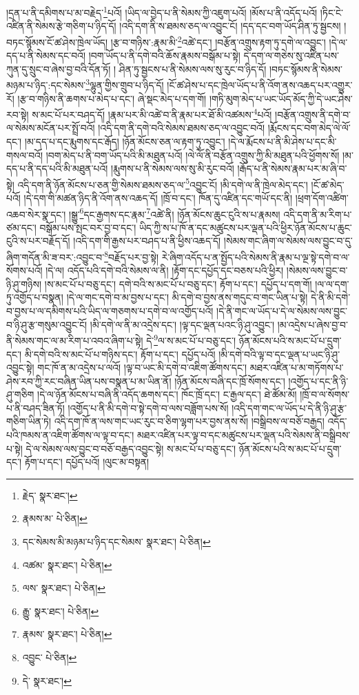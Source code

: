 །དྲན་པ་ནི་དམིགས་པ་མ་བརྗེད་\footnote{རྗེད་  སྣར་ཐང་། }པའོ། །ཡིད་ལ་བྱེད་པ་ནི་སེམས་ཀྱི་འཇུག་པའོ། །མོས་པ་ནི་འདོད་པའོ། །ཏིང་ངེ་འཛིན་ནི་སེམས་རྩེ་གཅིག་པ་ཉིད་དོ། །འདི་དག་ནི་ས་ཐམས་ཅད་ལ་འབྱུང་ངོ། །དད་དང་བག་ཡོད་ཤིན་ཏུ་སྦྱངས། །བཏང་སྙོམས་ངོ་ཚ་ཤེས་ཁྲེལ་ཡོད། །རྩ་བ་གཉིས་:རྣམ་མི་\footnote{རྣམས་མ་  པེ་ཅིན། }འཚེ་དང་། །བརྩོན་འགྲུས་རྟག་ཏུ་དགེ་ལ་འབྱུང་། །དེ་ལ་དད་པ་ནི་སེམས་དང་བའོ། །བག་ཡོད་པ་ནི་དགེ་བའི་ཆོས་རྣམས་བསྒོམ་པ་སྟེ། དེ་དག་ལ་གཅེས་སུ་འཛིན་པས་ཀུན་དུ་སྲུང་བ་ཞེས་བྱ་བའི་དོན་ཏོ། །
ཤིན་ཏུ་སྦྱངས་པ་ནི་སེམས་ལས་སུ་རུང་བ་ཉིད་དོ། །བཏང་སྙོམས་ནི་སེམས་མཉམ་པ་ཉིད་:དང་སེམས་\footnote{དང་སེམས་མི་མཉམ་པ་ཉིད་དང་སེམས་  སྣར་ཐང་།  པེ་ཅིན། }ལྷུན་གྱིས་གྲུབ་པ་ཉིད་དོ། །ངོ་ཚ་ཤེས་པ་དང་ཁྲེལ་ཡོད་པ་ནི་འོག་ནས་འཆད་པར་འགྱུར་རོ། །རྩ་བ་གཉིས་ནི་ཆགས་པ་མེད་པ་དང་། ཞེ་སྡང་མེད་པ་དག་གོ། །གཏི་མུག་མེད་པ་ཡང་ཡོད་མོད་ཀྱི་དེ་ཡང་ཤེས་རབ་སྟེ། ས་མང་པོ་པར་བཤད་དོ། །རྣམ་པར་མི་འཚེ་བ་ནི་རྣམ་པར་ཐོ་མི་འཚམས་\footnote{འཚམ་  སྣར་ཐང་།  པེ་ཅིན། }པའོ། །བརྩོན་འགྲུས་ནི་དགེ་བ་ལ་སེམས་མངོན་པར་སྤྲོ་བའོ། །འདི་དག་ནི་དགེ་བའི་སེམས་ཐམས་ཅད་ལ་འབྱུང་བའོ། །རྨོངས་དང་བག་མེད་ལེ་ལོ་དང་། །མ་དད་པ་དང་རྨུགས་དང་རྒོད། །ཉོན་མོངས་ཅན་ལ་རྟག་ཏུ་འབྱུང་། །དེ་ལ་རྨོངས་པ་ནི་མི་ཤེས་པ་དང་མི་གསལ་བའོ། །བག་མེད་པ་ནི་བག་ཡོད་པའི་མི་མཐུན་པའོ། །ལེ་ལོ་ནི་བརྩོན་འགྲུས་ཀྱི་མི་མཐུན་པའི་ཕྱོགས་སོ། །མ་དད་པ་ནི་དད་པའི་མི་མཐུན་པའོ། །རྨུགས་པ་ནི་སེམས་ལས་སུ་མི་རུང་བའོ། །རྒོད་པ་ནི་སེམས་རྣམ་པར་མ་ཞི་བ་སྟེ། འདི་དག་ནི་ཉོན་མོངས་པ་ཅན་གྱི་སེམས་ཐམས་ཅད་ལ་\footnote{ལས་  སྣར་ཐང་།  པེ་ཅིན། }འབྱུང་ངོ། །མི་དགེ་ལ་ནི་ཁྲེལ་མེད་དང་། །ངོ་ཚ་མེད་པའོ། །དེ་དག་གི་མཚན་ཉིད་ནི་འོག་ནས་འཆད་དོ། །ཁྲོ་བ་དང་། ཁོན་དུ་འཛིན་དང་གཡོ་དང་ནི། །ཕྲག་དོག་འཚིག་འཆབ་སེར་སྣ་དང་། །སྒྱུ་\footnote{རྒྱུ་  སྣར་ཐང་།  པེ་ཅིན། }དང་རྒྱགས་དང་རྣམ་\footnote{རྣམས་  སྣར་ཐང་།  པེ་ཅིན། }འཚེ་ནི། །ཉོན་མོངས་ཆུང་ངུའི་ས་པ་རྣམས། འདི་དག་ནི་མ་རིག་པ་ཙམ་དང་། བསྒོམ་པས་སྤང་བར་བྱ་བ་དང་། ཡིད་ཀྱི་ས་པ་ཁོ་ན་དང་མཚུངས་པར་ལྡན་པའི་ཕྱིར་ཉོན་མོངས་པ་ཆུང་ངུའི་ས་པར་བརྗོད་དོ། །འདི་དག་གི་རྒྱས་པར་བཤད་པ་ནི་ཕྱིས་འཆད་དོ། །སེམས་གང་ཞིག་ལ་སེམས་ལས་བྱུང་བ་དུ་ཞིག་གདོན་མི་ཟ་བར་:འབྱུང་བ་\footnote{འབྱུང་  པེ་ཅིན། }བརྗོད་པར་བྱ་སྟེ། རེ་ཞིག་འདོད་པ་ན་སྤྱོད་པའི་སེམས་ནི་རྣམ་པ་ལྔ་སྟེ་དགེ་བ་ལ་སོགས་པའོ། །དེ་ལ། འདོད་པའི་དགེ་བའི་སེམས་ལ་ནི། །རྟོག་དང་དཔྱོད་དང་བཅས་པའི་ཕྱིར། །སེམས་ལས་བྱུང་བ་ཉི་ཤུ་གཉིས། །ས་མང་པོ་པ་བཅུ་དང་། དགེ་བའི་ས་མང་པོ་པ་བཅུ་དང་། རྟོག་པ་དང་། དཔྱོད་པ་དག་གོ། །ལ་ལ་དག་ཏུ་འགྱོད་པ་བསྣན། །དེ་ལ་གང་དགེ་བ་མ་བྱས་པ་དང་། མི་དགེ་བ་བྱས་ནས་གདུང་བ་གང་ཡིན་པ་སྟེ། དེ་ནི་མི་དགེ་བ་བྱས་པ་ལ་དམིགས་པའི་ཡིད་ལ་གཅགས་པ་དགེ་བ་ལ་འགྱོད་པའོ། །དེ་ནི་གང་ལ་ཡོད་པ་དེ་ལ་སེམས་ལས་བྱུང་བ་ཉི་ཤུ་རྩ་གསུམ་འབྱུང་ངོ། །མི་དགེ་ལ་ནི་མ་འདྲེས་དང་། །ལྟ་དང་ལྡན་པའང་ཉི་ཤུ་འབྱུང་། །མ་འདྲེས་པ་ཞེས་བྱ་བ་ནི་སེམས་གང་ལ་མ་རིག་པ་འབའ་ཞིག་པ་སྟེ། དེ་\footnote{དེ་  སྣར་ཐང་། }ལ་ས་མང་པོ་པ་བཅུ་དང་། ཉོན་མོངས་པའི་ས་མང་པོ་པ་དྲུག་དང་། མི་དགེ་བའི་ས་མང་པོ་པ་གཉིས་དང་། རྟོག་པ་དང་། དཔྱོད་པའོ། །མི་དགེ་བའི་ལྟ་བ་དང་ལྡན་པ་ཡང་ཉི་ཤུ་འབྱུང་སྟེ། གང་ཁོ་ན་མ་འདྲེས་པ་ལའོ། །ལྟ་བ་ཡང་མི་དགེ་བ་འཇིག་ཚོགས་དང་། མཐར་འཛིན་པ་མ་གཏོགས་པ་ཤེས་རབ་ཀྱི་རང་བཞིན་ཡིན་པས་བསྣན་པ་མ་ཡིན་ནོ། །ཉོན་མོངས་བཞི་དང་ཁྲོ་སོགས་དང་། །འགྱོད་པ་དང་ནི་ཉི་ཤུ་གཅིག །དེ་ལ་ཉོན་མོངས་པ་བཞི་ནི་འདོད་ཆགས་དང་། ཁོང་ཁྲོ་དང་། ང་རྒྱལ་དང་། ཐེ་ཚོམ་མོ། །ཁྲོ་བ་ལ་སོགས་པ་ནི་བཤད་ཟིན་ཏོ། །འགྱོད་པ་ནི་མི་དགེ་བ་སྟེ་དགེ་བ་ལས་བཟློག་པས་སོ། །འདི་དག་གང་ལ་ཡོད་པ་དེ་ནི་ཉི་ཤུ་རྩ་གཅིག་ཡིན་ཏེ། འདི་དག་ཁོ་ན་ལས་གང་ཡང་རུང་བ་ཅིག་ལྷག་པར་བྱས་ནས་སོ། །བསྒྲིབས་ལ་བཅོ་བརྒྱད། འདོད་པའི་ཁམས་ན་འཇིག་ཚོགས་ལ་ལྟ་བ་དང་། མཐར་འཛིན་པར་ལྟ་བ་དང་མཚུངས་པར་ལྡན་པའི་སེམས་ནི་བསྒྲིབས་པ་སྟེ། དེ་ལ་སེམས་ལས་བྱུང་བ་བཅོ་བརྒྱད་འབྱུང་སྟེ། ས་མང་པོ་པ་བཅུ་དང་། ཉོན་མོངས་པའི་ས་མང་པོ་པ་དྲུག་དང་། རྟོག་པ་དང་། དཔྱོད་པའོ། །ལུང་མ་བསྟན། 